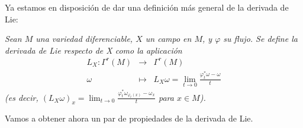 Ya estamos en disposición de dar una definición más general de la derivada de Lie:
\begin{defn}
  \em
  Sean $M$ una variedad diferenciable, $X$ un campo en $M$, y $\varphi$ su flujo. Se define la \emph{derivada de Lie respecto de X} como la aplicación  \begin{equation*}
    \begin{array}{rcl}
    L_X: \Gamma^r(M)& \longrightarrow & \Gamma^r (M) \\
    \omega & \longmapsto & L_X \omega = \lim_{t\rightarrow 0}\frac{\varphi^*_t \omega - \omega}{t}
  \end{array}
  \end{equation*}
  (es decir, $(L_X\omega)_x=\lim_{t\rightarrow 0}\frac{\varphi^*_t\omega_{\varphi_t(x)}-\omega_x}{t}$ para $x \in M$).
\end{defn}

Vamos a obtener ahora un par de propiedades de la derivada de Lie.

